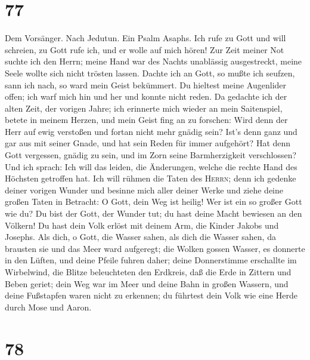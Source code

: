 \hypertarget{section-76}{%
\section{77}\label{section-76}}

 Dem Vorsänger. Nach Jedutun. Ein Psalm Asaphs. Ich rufe
zu Gott und will schreien, zu Gott rufe ich, und er wolle auf mich
hören!  Zur Zeit meiner Not suchte ich den Herrn; meine
Hand war des Nachts unablässig ausgestreckt, meine Seele wollte sich
nicht trösten lassen.  Dachte ich an Gott, so mußte ich
seufzen, sann ich nach, so ward mein Geist bekümmert.  Du
hieltest meine Augenlider offen; ich warf mich hin und her und konnte
nicht reden.  Da gedachte ich der alten Zeit, der vorigen
Jahre;  ich erinnerte mich wieder an mein Saitenspiel,
betete in meinem Herzen, und mein Geist fing an zu forschen:
 Wird denn der Herr auf ewig verstoßen und fortan nicht
mehr gnädig sein?  Ist's denn ganz und gar aus mit seiner
Gnade, und hat sein Reden für immer aufgehört?  Hat denn
Gott vergessen, gnädig zu sein, und im Zorn seine Barmherzigkeit
verschlossen?  Und ich sprach: Ich will das leiden, die
Änderungen, welche die rechte Hand des Höchsten getroffen hat.
 Ich will rühmen die Taten des \textsc{Herrn}; denn ich
gedenke deiner vorigen Wunder  und besinne mich aller
deiner Werke und ziehe deine großen Taten in Betracht:  O
Gott, dein Weg ist heilig! Wer ist ein so großer Gott wie du?
 Du bist der Gott, der Wunder tut; du hast deine Macht
bewiesen an den Völkern!  Du hast dein Volk erlöst mit
deinem Arm, die Kinder Jakobs und Josephs.  Als dich, o
Gott, die Wasser sahen, als dich die Wasser sahen, da brausten sie und
das Meer ward aufgeregt;  die Wolken gossen Wasser, es
donnerte in den Lüften, und deine Pfeile fuhren daher; 
deine Donnerstimme erschallte im Wirbelwind, die Blitze beleuchteten den
Erdkreis, daß die Erde in Zittern und Beben geriet;  dein
Weg war im Meer und deine Bahn in großen Wassern, und deine Fußstapfen
waren nicht zu erkennen;  du führtest dein Volk wie eine
Herde durch Mose und Aaron.

\hypertarget{section-77}{%
\section{78}\label{section-77}}

